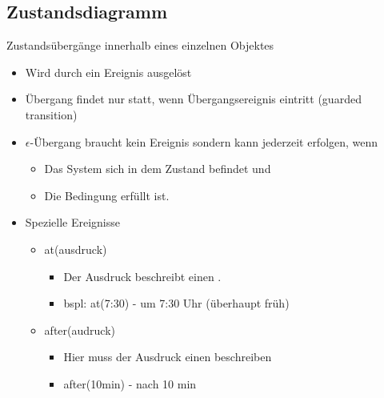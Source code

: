 \subsection{Zustandsdiagramm}
Zustandsübergänge innerhalb eines einzelnen Objektes
\begin{itemize}
    \item Wird durch ein Ereignis ausgelöst
    \item Übergang findet nur statt, wenn Übergangsereignis eintritt (guarded transition)
    \item $\epsilon$-Übergang braucht kein Ereignis sondern kann jederzeit erfolgen, wenn
    \begin{itemize}
        \item Das System sich in dem Zustand befindet und
        \item Die Bedingung erfüllt ist.
    \end{itemize}
    \item Spezielle Ereignisse
    \begin{itemize}
        \item at(ausdruck)
        \begin{itemize}
            \item Der Ausdruck beschreibt einen .
            \item bspl: at(7:30) - um 7:30 Uhr (überhaupt  früh)
        \end{itemize}
        \item after(audruck)
        \begin{itemize}
            \item Hier muss der Ausdruck einen  beschreiben
            \item after(10min) - nach 10 min
        \end{itemize}
    \end{itemize}
\end{itemize}

